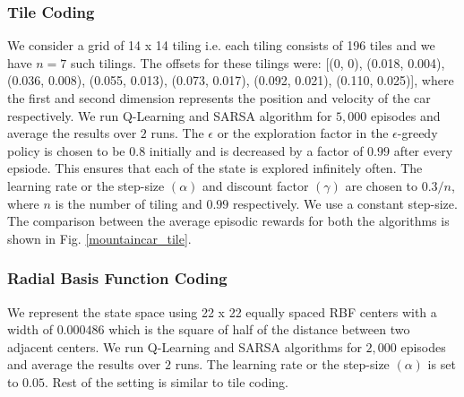 \documentclass{article}
\begin{document}
        \subsubsection{Tile Coding}
        We consider a grid of 14 x 14 tiling i.e. each tiling consists of 196 tiles and we have $n=7$ such tilings. The offsets for these tilings were:
        [(0, 0), (0.018, 0.004), (0.036, 0.008), (0.055, 0.013), (0.073, 0.017), (0.092, 0.021), (0.110, 0.025)], where the first and second dimension represents 
        the position and velocity of the car respectively. We run Q-Learning and SARSA algorithm for $5,000$ episodes and 
        average the results over $2$ runs. The $\epsilon$ or the exploration factor in the $\epsilon$-greedy policy is chosen to be $0.8$ initially and is 
        decreased by a factor of $0.99$ after every epsiode. This ensures that each of the state is explored infinitely often. The learning rate or the step-size 
        $(\alpha)$ and discount factor $(\gamma)$ are chosen to $0.3/n$, where $n$ is the number of tiling and $0.99$ respectively. We use a constant step-size.
        The comparison between the average episodic rewards for both the algorithms is shown in Fig. \ref{mountaincar_tile}.

        \subsubsection{Radial Basis Function Coding}
        We represent the state space using 22 x 22 equally spaced RBF centers with a width of $0.000486$ which is the square of half of the distance between two 
        adjacent centers. We run Q-Learning and SARSA algorithms for $2,000$ episodes and average the results over $2$ runs. The learning rate or the step-size 
        $(\alpha)$ is set to $0.05$. Rest of the setting is similar to tile coding. 
\end{document}
